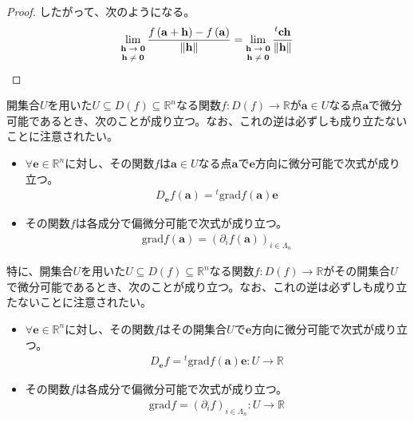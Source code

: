 \documentclass[dvipdfmx]{jsarticle}
\begin{document}
\begin{proof}
したがって、次のようになる。
\begin{align*}
\lim_{\scriptsize \begin{matrix}
\mathbf{h} \rightarrow \mathbf{0} \\
\mathbf{h} \neq \mathbf{0} \\
\end{matrix}}\frac{f\left( \mathbf{a} + \mathbf{h} \right) - f\left( \mathbf{a} \right)}{\left\| \mathbf{h} \right\|} = \lim_{\scriptsize \begin{matrix}
\mathbf{h} \rightarrow \mathbf{0} \\
\mathbf{h} \neq \mathbf{0} \\
\end{matrix}}\frac{{}^{t}\mathbf{ch}}{\left\| \mathbf{h} \right\|}
\end{align*}
\end{proof}
\begin{thm}\label{4.2.5.3}
開集合$U$を用いた$U \subseteq D(f) \subseteq \mathbb{R}^{n}$なる関数$f:D(f) \rightarrow \mathbb{R}$が$\mathbf{a} \in U$なる点$\mathbf{a}$で微分可能であるとき、次のことが成り立つ。なお、これの逆は必ずしも成り立たないことに注意されたい。
\begin{itemize}
\item
  $\forall\mathbf{e} \in \mathbb{R}^{n}$に対し、その関数$f$は$\mathbf{a} \in Uなる点\mathbf{a}で\mathbf{e}$方向に微分可能で次式が成り立つ。
\begin{align*}
D_{\mathbf{e}}f\left( \mathbf{a} \right) ={}^{t}\mathrm{grad}f\left( \mathbf{a} \right)\mathbf{e}
\end{align*}
\item
  その関数$f$は各成分で偏微分可能で次式が成り立つ。
\begin{align*}
\mathrm{grad}f\left( \mathbf{a} \right) = \left( \partial_{i}f\left( \mathbf{a} \right) \right)_{i \in \varLambda_{n}}
\end{align*}
\end{itemize}\par
特に、開集合$U$を用いた$U \subseteq D(f) \subseteq \mathbb{R}^{n}$なる関数$f:D(f) \rightarrow \mathbb{R}$がその開集合$U$で微分可能であるとき、次のことが成り立つ。なお、これの逆は必ずしも成り立たないことに注意されたい。
\begin{itemize}
\item
  $\forall\mathbf{e} \in \mathbb{R}^{n}$に対し、その関数$f$はその開集合$U$で$\mathbf{e}$方向に微分可能で次式が成り立つ。
\begin{align*}
D_{\mathbf{e}}f ={}^{t}\mathrm{grad}f\left( \mathbf{a} \right)\mathbf{e}:U \rightarrow \mathbb{R}
\end{align*}
\item
  その関数$f$は各成分で偏微分可能で次式が成り立つ。
\begin{align*}
\mathrm{grad}f = \left( \partial_{i}f \right)_{i \in \varLambda_{n}}:U \rightarrow \mathbb{R}
\end{align*}
\end{itemize}
\end{thm}
\end{document}
